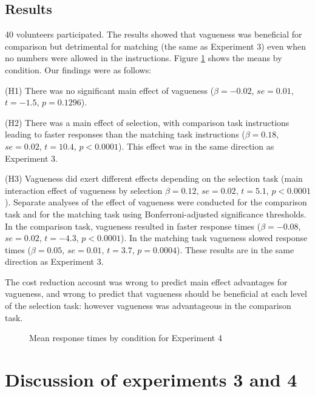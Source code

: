 \documentclass[%
man,		%
floatsintext,%
apacite%
]{apa6}
\begin{document}
\subsection{Results}%
40 volunteers participated.
The results showed that vagueness was beneficial for comparison but detrimental for matching (the same as Experiment 3) even when no numbers were allowed in the instructions. 
Figure \ref{resultse4} shows the means by condition. Our findings were as follows:

{\small
\begin{APAenumerate}
	\item [(H1)] There was no significant main effect of vagueness ($\beta=-0.02$, $se=0.01$, $t=-1.5$, $p=0.1296$). 
	\item [(H2)] There was a main effect of selection, with comparison task instructions leading to faster responses than the matching task instructions ($\beta=0.18$, $se=0.02$, $t=10.4$, $p<0.0001$).  This effect was in the same direction as Experiment 3. 
	\item[(H3)] Vagueness did exert different effects depending on the selection task (main interaction effect of vagueness by selection $\beta=0.12$, $se=0.02$, $t=5.1$, $p<0.0001$). 
Separate analyses of the effect of vagueness were conducted for the comparison task and for the matching task using Bonferroni-adjusted significance thresholds. 
In the comparison task, vagueness resulted in faster response times ($\beta=-0.08$, $se=0.02$, $t=-4.3$, $p<0.0001$). 
In the matching task vagueness slowed response times ($\beta=0.05$, $se=0.01$, $t=3.7$, $p=0.0004$). 
These results are in the same direction as Experiment 3.
\end{APAenumerate}
}

The cost reduction account was wrong to predict main effect advantages for vagueness, and wrong to predict that vagueness should be beneficial at each level of the selection task: however vagueness was advantageous in the comparison task.

\begin{figure}[htbp]
\centering
{}
\caption{Mean response times by condition for Experiment 4}
\label{resultse4}
\end{figure}

\section{Discussion of experiments 3 and 4}
\end{document}
